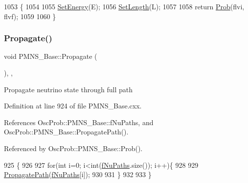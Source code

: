 \begin{DoxyCode}
1053 \{
1054 
1055   \hyperlink{classOscProb_1_1PMNS__Base_a95b3b0d0cab5e6a54b5ef99587f837c0}{SetEnergy}(E);
1056   \hyperlink{classOscProb_1_1PMNS__Base_a6241325b1bd28cafa556daaecbe4ed62}{SetLength}(L);
1057 
1058   \textcolor{keywordflow}{return} \hyperlink{classOscProb_1_1PMNS__Base_aec5c399b93261f1962a4b7dbbb44b973}{Prob}(flvi, flvf);
1059 
1060 \}
\end{DoxyCode}
\mbox{\label{classOscProb_1_1PMNS__Base_a054e3a8b05b9a958b6fa416e4a835e3e}} 
\subsubsection{\texorpdfstring{Propagate()}{Propagate()}}
{\footnotesize\ttfamily void P\+M\+N\+S\+\_\+\+Base\+::\+Propagate (\begin{DoxyParamCaption}{ }\end{DoxyParamCaption})\hspace{0.3cm}{\ttfamily [protected]}, {\ttfamily [virtual]}, {\ttfamily [inherited]}}

Propagate neutrino state through full path 

Definition at line 924 of file P\+M\+N\+S\+\_\+\+Base.\+cxx.



References Osc\+Prob\+::\+P\+M\+N\+S\+\_\+\+Base\+::f\+Nu\+Paths, and Osc\+Prob\+::\+P\+M\+N\+S\+\_\+\+Base\+::\+Propagate\+Path().



Referenced by Osc\+Prob\+::\+P\+M\+N\+S\+\_\+\+Base\+::\+Prob().


\begin{DoxyCode}
925 \{
926 
927   \textcolor{keywordflow}{for}(\textcolor{keywordtype}{int} i=0; i<int(\hyperlink{classOscProb_1_1PMNS__Base_a69db9d57e12fc7cbe0431bc6c18fac93}{fNuPaths}.size()); i++)\{
928 
929     \hyperlink{classOscProb_1_1PMNS__Base_accb08503acc162188041d7a96a280462}{PropagatePath}(\hyperlink{classOscProb_1_1PMNS__Base_a69db9d57e12fc7cbe0431bc6c18fac93}{fNuPaths}[i]);
930 
931   \}
932 
933 \}
\end{DoxyCode}
\mbox{\label{classOscProb_1_1PMNS__Deco_aa75341a3608bb12d7792a14e67ef2d5e}} 
